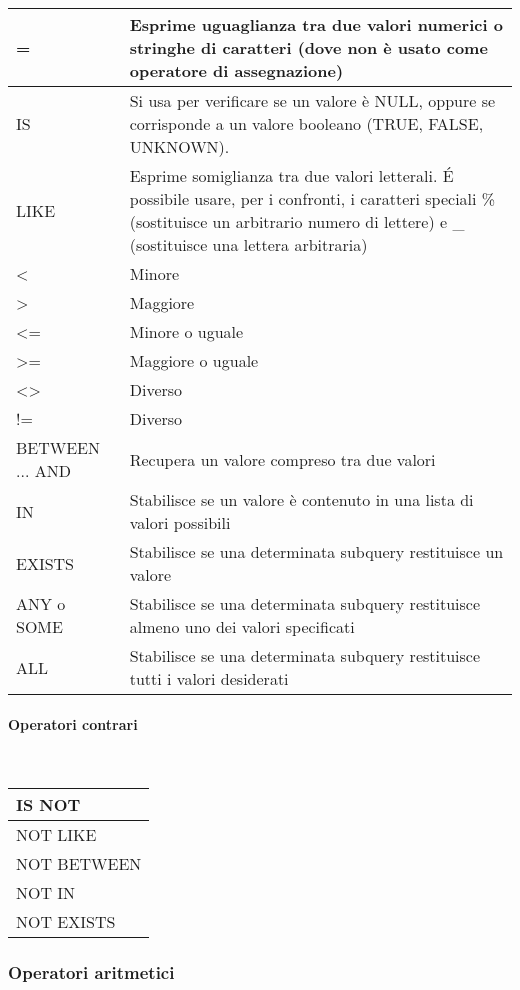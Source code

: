 \documentclass[a4paper]{article}
\begin{document}
\begin{tabularx}{350pt}{|l|X|}
  \hline
  = &  Esprime uguaglianza tra due valori numerici o stringhe di caratteri (dove non è usato come operatore di assegnazione)\\
  \hline
  IS & Si usa per verificare se un valore è NULL, oppure se corrisponde a un valore booleano (TRUE, FALSE, UNKNOWN).\\
  \hline
  LIKE & Esprime somiglianza tra due valori letterali. É possibile usare, per i confronti, i caratteri speciali \% (sostituisce un arbitrario numero di lettere) e \_ (sostituisce una lettera arbitraria)\\
  \hline
  < & Minore\\
  \hline
  > & Maggiore\\
  \hline
  <= & Minore o uguale\\
  \hline
  >= & Maggiore o uguale\\
  \hline
  <> & Diverso\\
  \hline
  != & Diverso\\
  \hline
  BETWEEN ... AND & Recupera un valore compreso tra due valori\\
  \hline
  IN & Stabilisce se un valore è contenuto in una lista di valori possibili\\
  \hline
  EXISTS & Stabilisce se una determinata subquery restituisce un valore\\
  \hline
  ANY o SOME & Stabilisce se una determinata subquery restituisce almeno uno dei valori specificati\\
  \hline
  ALL & Stabilisce se una determinata subquery restituisce tutti i valori desiderati\\
  \hline
\end{tabularx}\par \paragraph{Operatori contrari} \ \medskip\\
\begin{tabular}{|l|}
  \hline
  IS NOT\\
  \hline
  NOT LIKE\\
  \hline
  NOT BETWEEN\\
  \hline
  NOT IN\\
  \hline
  NOT EXISTS\\
  \hline
\end{tabular}\par \subsubsection{Operatori aritmetici}
\end{document}
